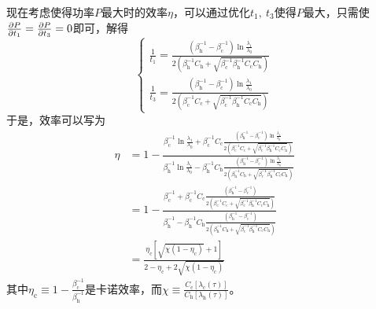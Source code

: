 现在考虑使得功率$P$最大时的效率$\eta$，可以通过优化$t_1,\ t_3$使得$P$最大，只需使$\frac{\partial P}{\partial t_1}=\frac{\partial P}{\partial t_3}=0$即可，解得
\begin{equation}
    \left\{\begin{array}{l}
        \frac{1}{t_{1}}=\frac{\left(\beta_{\mathrm{h}}^{-1}-\beta_{\mathrm{c}}^{-1}\right) \ln \frac{\lambda_{1}}{\lambda_{0}}}{2\left(\beta_{\mathrm{h}}^{-1} C_{\mathrm{h}}+\sqrt{\beta_{\mathrm{c}}^{-1} \beta_{\mathrm{h}}^{-1} C_{\mathrm{c}} C_{\mathrm{h}}}\right)}\\
        \frac{1}{t_{3}}=\frac{\left(\beta_{\mathrm{h}}^{-1}-\beta_{\mathrm{c}}^{-1}\right) \ln \frac{\lambda_{1}}{\lambda_{0}}}{2\left(\beta_{\mathrm{c}}^{-1} C_{\mathrm{c}}+\sqrt{\beta_{\mathrm{c}}^{-1} \beta_{\mathrm{h}}^{-1} C_{\mathrm{c}} C_{\mathrm{h}}}\right)}
    \end{array}\right.
    \label{eq3.36}
\end{equation}
于是，效率可以写为
\begin{equation}
    \begin{split}
        \eta&=1- \frac{\beta_{\mathrm{c}}^{-1} \ln{\frac{\lambda_1}{\lambda_0}} + \beta_{\mathrm{c}}^{-1} C_{\mathrm{c}} \frac{\left(\beta_{\mathrm{h}}^{-1}-\beta_{\mathrm{c}}^{-1}\right) \ln \frac{\lambda_{1}}{\lambda_{0}}}{2\left(\beta_{\mathrm{c}}^{-1} C_{\mathrm{c}}+\sqrt{\beta_{\mathrm{c}}^{-1} \beta_{\mathrm{h}}^{-1} C_{\mathrm{c}} C_{\mathrm{h}}}\right)}}{\beta_{\mathrm{h}}^{-1} \ln{\frac{\lambda_1}{\lambda_0}} - \beta_{\mathrm{h}}^{-1} C_{\mathrm{h}} \frac{\left(\beta_{\mathrm{h}}^{-1}-\beta_{\mathrm{c}}^{-1}\right) \ln \frac{\lambda_{1}}{\lambda_{0}}}{2\left(\beta_{\mathrm{h}}^{-1} C_{\mathrm{h}}+\sqrt{\beta_{\mathrm{c}}^{-1} \beta_{\mathrm{h}}^{-1} C_{\mathrm{c}} C_{\mathrm{h}}}\right)}}\\
        &=1- \frac{\beta_{\mathrm{c}}^{-1}  + \beta_{\mathrm{c}}^{-1} C_{\mathrm{c}} \frac{\left(\beta_{\mathrm{h}}^{-1}-\beta_{\mathrm{c}}^{-1}\right) }{2\left(\beta_{\mathrm{c}}^{-1} C_{\mathrm{c}}+\sqrt{\beta_{\mathrm{c}}^{-1} \beta_{\mathrm{h}}^{-1} C_{\mathrm{c}} C_{\mathrm{h}}}\right)}}{\beta_{\mathrm{h}}^{-1}  - \beta_{\mathrm{h}}^{-1} C_{\mathrm{h}} \frac{\left(\beta_{\mathrm{h}}^{-1}-\beta_{\mathrm{c}}^{-1}\right) }{2\left(\beta_{\mathrm{h}}^{-1} C_{\mathrm{h}}+\sqrt{\beta_{\mathrm{c}}^{-1} \beta_{\mathrm{h}}^{-1} C_{\mathrm{c}} C_{\mathrm{h}}}\right)}}\\
        &=\frac{\eta_{\mathrm{c}}\left[\sqrt{\chi(1-\eta_{\mathrm{c}})}+1\right]}{2-\eta_{\mathrm{c}}+2 \sqrt{\chi\left(1-\eta_{\mathrm{c}}\right)}}
    \end{split}
    \label{eq3.37}
\end{equation}
其中$\eta_{\mathrm{c}}\equiv 1-\frac{\beta_{\mathrm{c}}^{-1}}{\beta_{\mathrm{h}}^{-1}}$是卡诺效率，而$\chi\equiv\frac{C_{\mathrm{c}} [\lambda_{\mathrm{c}}(\tau)]}{C_{\mathrm{h}} [\lambda_{\mathrm{h}}(\tau)]}$。

